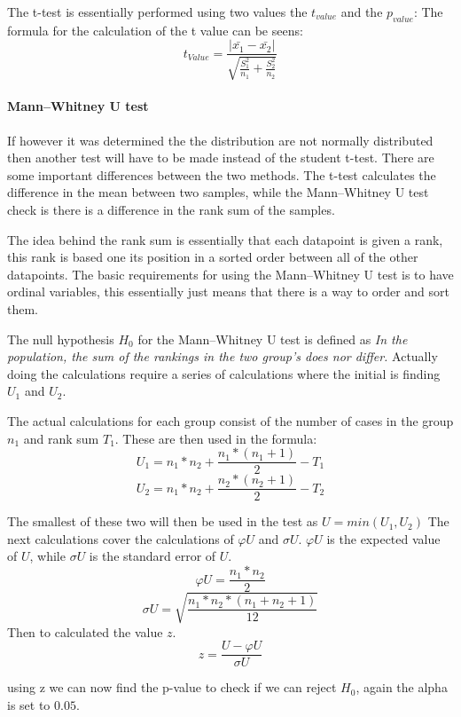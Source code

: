 The t-test is essentially performed using two values the $t_{value}$ and the $p_{value}$:
The formula for the calculation of the t value can be seens:
$$t_{Value} = \frac{|\bar{x_1}- \bar{x_2}|}{\sqrt{\frac{S_1^2}{n_1} + \frac{S_2^2}{n_2}}}$$ 

\paragraph{Mann–Whitney U test}
If however it was determined the the distribution are not normally distributed then another test will have to be made instead of the student t-test. There are some important differences between the two methods. The t-test calculates the difference in the mean between two samples, while the Mann–Whitney U test check is there is a difference in the rank sum of the samples\cite{mann1947test}. 

The idea behind the rank sum is essentially that each datapoint is given a rank, this rank is based one its position in a sorted order between all of the other datapoints. 
The basic requirements for using the Mann–Whitney U test is to have ordinal variables, this essentially just means that there is a way to order and sort them.

The null hypothesis $H_0$ for the Mann–Whitney U test is defined as \textit{In the population, the sum of the rankings in the two group's does nor differ.}
Actually doing the calculations require a series of calculations where the initial is finding $U_1$ and $U_2$.

The actual calculations for each group consist of the number of cases in the group $n_1$ and rank sum $T_1$. These are then used in the formula:
$$U_1 = n_1*n_2+\frac{n_1*(n_1+1)}{2}-T_1$$ 
$$U_2 = n_1*n_2+\frac{n_2*(n_2+1)}{2}-T_2$$

The smallest of these two will then be used in the test as $U=min(U_1,U_2)$
The next calculations cover the calculations of $\varphi U$ and $\sigma U$.
$\varphi U$ is the expected value of $U$, while $\sigma U$ is the standard error of $U$.
$$\varphi U = \frac{n_1*n_2}{2}$$
$$\sigma U = \sqrt{\frac{n_1*n_2*(n_1+n_2+1)}{12}}$$
Then to calculated the value $z$.
$$z = \frac{U-\varphi U}{\sigma U}$$

using z we can now find the p-value to check if we can reject $H_0$, again the alpha is set to $0.05$. 